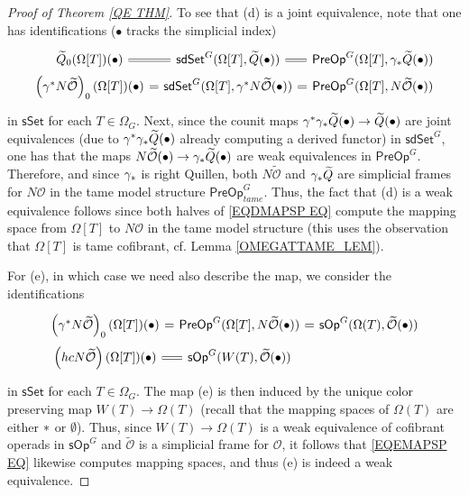\documentclass[a4paper,10pt
,draft
]{article}%
\numberwithin{equation}{section}
\numberwithin{figure}{section}
\theoremstyle{definition} %
\newcommand{\sSet}{\ensuremath{\mathsf{sSet}}}%
\newcommand{\sOp}{\ensuremath{\mathsf{sOp}}}%
\renewcommand{\O}{\ensuremath{\mathcal O}}
\newcommand{\1}{\ensuremath{\mathbbm 1}}%
\begin{document}
\begin{proof}[Proof of Theorem \ref{QE THM}]
To see that (d) is a joint equivalence,
note that one has identifications 
($\bullet$ tracks the simplicial index)
\begin{equation}\label{EQDMAPSP EQ}
\begin{tikzcd}[row sep=0,column sep=7pt]
	\widetilde{Q}_0(\Omega[T])(\bullet)
	\ar[equal]{r}
&
	\mathsf{sdSet}^G(\Omega[T],\widetilde{Q}(\bullet))
	\ar[equal]{r}
&
	\mathsf{PreOp}^G(\Omega[T],\gamma_{\**}\widetilde{Q}(\bullet))
\\
	\left(\gamma^{\**} N \widetilde{\mathcal{O}}\right)_0(\Omega[T])(\bullet)
	\ar[equal]{r}
&
	\mathsf{sdSet}^G(\Omega[T],\gamma^{\**} N \widetilde{\mathcal{O}}(\bullet))
	\ar[equal]{r}
&
	\mathsf{PreOp}^G(\Omega[T], N \widetilde{\mathcal{O}}(\bullet))
\end{tikzcd}
\end{equation}
in $\sSet$ for each $T \in \Omega_G$.
Next, since the counit maps 
$\gamma^{\**} \gamma_{\**} \widetilde{Q}(\bullet) \to \widetilde{Q}(\bullet)$
are joint equivalences
(due to $\gamma^{\**} \gamma_{\**} \widetilde{Q}(\bullet)$ already computing a derived functor)
in 
$\mathsf{sdSet}^G$,
one has that the maps
$N\widetilde{\O}(\bullet) \to \gamma_{\**}
\widetilde{Q}(\bullet)$
are weak equivalences in $\mathsf{PreOp}^G$.
Therefore, and since $\gamma_{\**}$ is right Quillen,
both $N\widetilde{\O}$ and $\gamma_{\**}\widetilde{Q}$
are simplicial frames for $N \O$
in the tame model structure
$\mathsf{PreOp}^G_{tame}$.
Thus, the fact that (d) is a weak equivalence
follows since both halves of \eqref{EQDMAPSP EQ}
compute the mapping space from 
$\Omega[T]$ to $N \O$
in the tame model structure
(this uses the observation that
$\Omega[T]$ is tame cofibrant, cf. Lemma \ref{OMEGATTAME_LEM}).


For (e), in which case we need also describe the map,
we consider the identifications
\begin{equation}\label{EQEMAPSP EQ}
\begin{tikzcd}[row sep=0,column sep=7pt]
	\left(\gamma^{\**} N \widetilde{\mathcal{O}}\right)_0(\Omega[T])(\bullet)
	\ar[equal]{r}
&
	\mathsf{PreOp}^G(\Omega[T], N \widetilde{\mathcal{O}}(\bullet))
	\ar[equal]{r}
&
	\mathsf{sOp}^G(\Omega(T), \widetilde{\mathcal{O}}(\bullet))
\\
	\left(hcN \widetilde{\mathcal{O}} \right)(\Omega[T])(\bullet)
	\ar[equal]{r} 
&
	\mathsf{sOp}^G(W(T),  \widetilde{\mathcal{O}}(\bullet))
\end{tikzcd}
\end{equation}
in $\mathsf{sSet}$ for each $T \in \Omega_G$.
The map (e) is then induced by the unique color preserving map
$W(T) \to \Omega(T)$ (recall that the mapping spaces of $\Omega(T)$ are either $\**$ or $\emptyset$).
Thus, since $W(T) \to \Omega(T)$ is a weak equivalence of cofibrant operads in $\sOp^G$
and $\widetilde{\O}$ is a simplicial frame for $\O$,
it follows that 
\eqref{EQEMAPSP EQ}
likewise computes mapping spaces, 
and thus (e) is indeed a weak equivalence. 


\end{proof}
\end{document}

